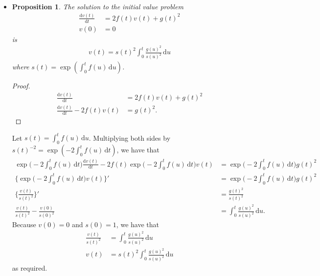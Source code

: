 \documentclass[10pt]{article}
\newtheorem{proposition}[lemma]{Proposition}
\newcommand{\dee}{\mathrm{d}}
\begin{document}
\begin{itemize}
  \item \begin{proposition} \label{thm:linear-sde-variance}
    The solution to the initial value problem
    \begin{align*}
      \frac{\dee v(t)}{\dee t} &= 2f(t)v(t) + g(t)^2 \\
      v(0) &= 0      
    \end{align*}
    is
    \begin{align*}
      v(t) = s(t)^2 \int_0^t \frac{g(u)^2}{s(u)^2}\, \dee u
    \end{align*}
    where $s(t) = \exp(\int_0^t f(u)\, \dee u)$.
  \end{proposition}
  \begin{proof}
    \begin{align*}
    \frac{\dee v(t)}{\dee t} &= 2f(t)v(t) + g(t)^2 \\
    \frac{\dee v(t)}{\dee t} - 2f(t)v(t) &= g(t)^2.
    \end{align*}
  \end{proof}
  Let $s(t) = \int_0^t f(u)\, \dee u$.
  Multiplying both sides by $s(t)^{-2} = \exp(-2\int_0^t f(u)\, \dee t)$, we have that
  \begin{align*}
    \exp\bigg( -2 \int_0^t f(u)\, \dee t \bigg) \frac{\dee v(t)}{\dee t}
    - 2f(t) \exp\bigg( -2 \int_0^t f(u)\, \dee t \bigg) v(t)
    &= \exp\bigg( -2 \int_0^t f(u)\, \dee t \bigg) g(t)^2 \\
    \bigg\{ \exp\bigg( -2 \int_0^t f(u)\, \dee t \bigg) v(t) \bigg\}'
    &= \exp\bigg( -2 \int_0^t f(u)\, \dee t \bigg) g(t)^2 \\
    \bigg\{ \frac{v(t)}{s(t)^2} \bigg\}'
    &= \frac{g(t)^2}{s(t)^2} \\
    \frac{v(t)}{s(t)^2} - \frac{v(0)}{s(0)^2} &= \int_0^t \frac{g(u)^2}{s(u)^2}\, \dee u.
  \end{align*}
  Because $v(0) = 0$ and $s(0) = 1$, we have that
  \begin{align*}
    \frac{v(t)}{s(t)^2} &= \int_0^t \frac{g(u)^2}{s(u)^2}\, \dee u \\
    v(t) &= s(t)^2 \int_0^t \frac{g(u)^2}{s(u)^2}\, \dee u
  \end{align*}
  as required.
\end{itemize}


  
\end{document}
